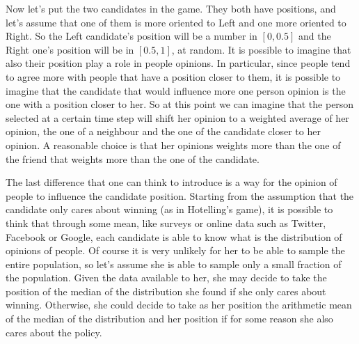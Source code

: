 \documentclass[11pt,a4paper,twocolumn]{article}
\begin{document}
Now let's put the two candidates in the game. They both have positions, and let's assume that one of them is more oriented to Left and one more oriented to Right. So the Left candidate's position will be a number in $[0,0.5]$ and the Right one's position will be in $[0.5,1]$, at random. 
It is possible to imagine that also their position play a role in people opinions. In particular, since people tend to agree more with people that have a position closer to them, it is possible to imagine that the candidate that would influence more one person opinion is the one with a position closer to her.
So at this point we can imagine that the person selected at a certain time step will shift her opinion to a weighted average of her opinion, the one of a neighbour and the one of the candidate closer to her opinion. A reasonable choice is that her opinions weights more than the one of the friend that weights more than the one of the candidate.

The last difference that one can think to introduce is a way for the opinion of people to influence the candidate position.
Starting from the assumption that the candidate only cares about winning (as in Hotelling's game), it is possible to think that through some mean, like surveys or online data such as Twitter, Facebook or Google, each candidate is able to know what is the distribution of opinions of people. Of course it is very unlikely for her to be able to sample the entire population, so let's assume she is able to sample only a small fraction of the population. Given the data available to her, she may decide to take the position of the median of the distribution she found if she only cares about winning. Otherwise, she could decide to take as her position the arithmetic mean of the median of the distribution and her position if for some reason she also cares about the policy.
\end{document}
